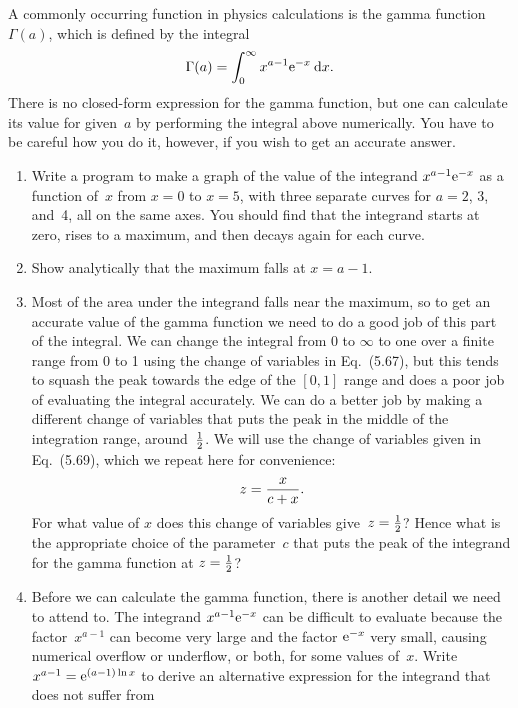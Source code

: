 \documentclass[12pt]{article}
\begin{document}
\begin{exercises}
\exskip A commonly occurring function in physics calculations is the
gamma function~$\Gamma(a)$, which is defined by the integral
\begin{displaymath}
\Gamma(a) = \int_0^\infty x^{a-1} \mathrm{e}^{-x} \>\mathrm{d} x.
\end{displaymath}
There is no closed-form expression for the gamma function, but one can
calculate its value for given~$a$ by performing the integral above
numerically.  You have to be careful how you do it, however, if you wish to
get an accurate answer.
\begin{enumerate}\setlength{\itemsep}{0pt}
\item Write a program to make a graph of the value of the integrand
  $x^{a-1} \mathrm{e}^{-x}$ as a function of~$x$ from $x=0$ to $x=5$, with three
  separate curves for $a=2$, 3, and~4, all on the same axes.  You should
  find that the integrand starts at zero, rises to a maximum, and then
  decays again for each curve.
\item Show analytically that the maximum falls at $x=a-1$.
\item Most of the area under the integrand falls near the maximum, so to
  get an accurate value of the gamma function we need to do a good job of
  this part of the integral. We can change the integral from 0 to $\infty$
  to one over a finite range from 0 to 1 using the change of variables in
  Eq.~(5.67), but this tends to squash the peak towards the edge of the
  $[0,1]$ range and does a poor job of evaluating the integral accurately.
  We can do a better job by making a different change of variables that
  puts the peak in the middle of the integration range, around~$\tfrac12$.  We
  will use the change of variables given in Eq.~(5.69), which we repeat
  here for convenience:
\begin{displaymath}
z = {x\over c+x}.
\end{displaymath}
For what value of $x$ does this change of variables give~$z=\tfrac12$?  Hence
what is the appropriate choice of the parameter~$c$ that puts the peak of
the integrand for the gamma function at $z=\tfrac12$?
\item Before we can calculate the gamma function, there is another detail
  we need to attend to.  The integrand $x^{a-1} \mathrm{e}^{-x}$ can be difficult
  to evaluate because the factor~$x^{a-1}$ can become very large and the
  factor $\mathrm{e}^{-x}$ very small, causing numerical overflow or underflow, or
  both, for some values of~$x$.  Write $x^{a-1}=\mathrm{e}^{(a-1)\ln x}$ to derive
  an alternative expression for the integrand that does not suffer from

\end{enumerate}
\end{exercises}
\end{document}
